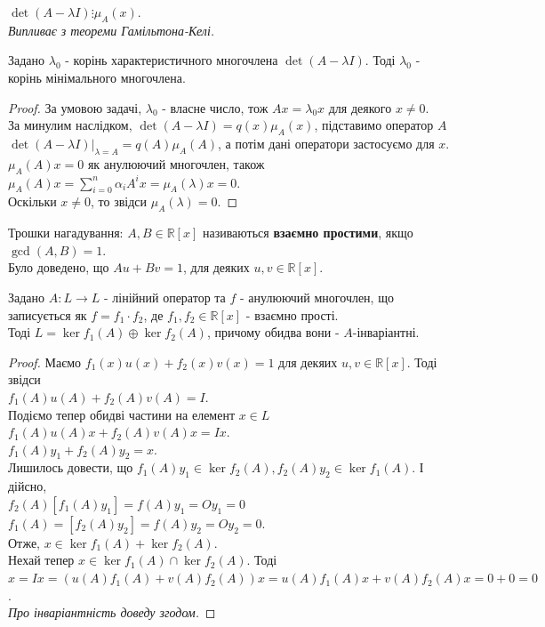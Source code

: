\documentclass{math_library}
\begin{document}
\begin{corollary}
$\det (A-\lambda I) \vdots \mu_A(x)$.\\
\textit{Випливає з теореми Гамільтона-Келі.}
\end{corollary}

\begin{proposition}
Задано $\lambda_0$ - корінь характеристичного многочлена $\det(A-\lambda I)$. Тоді $\lambda_0$ - корінь мінімального многочлена.
\end{proposition}

\begin{proof}
За умовою задачі, $\lambda_0$ - власне число, тож $Ax = \lambda_0 x$ для деякого $x \neq 0$.\\
За минулим наслідком, $\det(A-\lambda I) = q(x)\mu_A(x)$, підставимо оператор $A$\\
$\det(A-\lambda I)|_{\lambda = A} = q(A) \mu_A(A)$, а потім дані оператори застосуємо для $x$.\\
$\mu_A(A)x = 0$ як анулюючий многочлен, також\\
$\mu_A(A)x = \displaystyle\sum_{i=0}^n \alpha_i A^ix = \mu_A(\lambda) x = 0$.\\
Оскільки $x \neq 0$, то звідси $\mu_A(\lambda) = 0$.
\end{proof}

Трошки нагадування: $A,B \in \mathbb{R}[x]$ називаються \textbf{взаємно простими}, якщо $\gcd(A,B)=1$.\\
Було доведено, що $Au + Bv = 1$, для деяких $u,v \in \mathbb{R}[x]$.

\begin{theorem}
Задано $A: L \to L$ - лінійний оператор та $f$ - анулюючий многочлен, що записується як $f = f_1 \cdot f_2$, де $f_1,f_2 \in \mathbb{R}[x]$ - взаємно прості.\\
Тоді $L = \ker f_1(A)  \oplus  \ker f_2(A)$, причому обидва вони - $A$-інваріантні.
\end{theorem}

\begin{proof}
Маємо $f_1(x)u(x) + f_2(x)v(x) = 1$ для декяих $u,v \in \mathbb{R}[x]$. Тоді звідси\\
$f_1(A)u(A) + f_2(A)v(A) = I$.\\
Подіємо тепер обидві частини на елемент $x \in L$\\
$f_1(A)u(A)x + f_2(A)v(A)x = Ix$.\\
$f_1(A)y_1 + f_2(A)y_2 = x$. \\
Лишилось довести, що $f_1(A) y_1 \in \ker f_2(A), f_2(A) y_2 \in \ker f_1(A)$. І дійсно,\\
$f_2(A) [f_1(A)y_1] = f(A) y_1 = O y_1 = 0$\\
$f_1(A) = [f_2(A)y_2] = f(A) y_2 = O y_2 = 0$.\\
Отже, $x \in \ker f_1(A) + \ker f_2(A)$.\\
Нехай тепер $x \in \ker f_1(A) \cap \ker f_2(A)$. Тоді\\
$x = Ix = (u(A)f_1(A)+v(A)f_2(A))x = u(A)f_1(A)x + v(A)f_2(A)x = 0 + 0 = 0$.
\bigskip \\
\textit{Про інваріантність доведу згодом.}
\end{proof}
\end{document}
